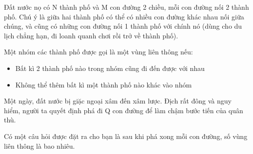 Đất nước nọ có N thành phố và M con đường 2 chiều, mỗi con đường nối 2 thành phố. Chú ý là giữa hai thành phố có thể có nhiều con đường khác nhau nối giữa chúng, và cũng có những con đường nối 1 thành phố với chính nó (dùng cho du lịch chẳng hạn, đi loanh quanh chơi rồi trở về thành phố).  

   Một nhóm các thành phố được gọi là một vùng liên thông nếu:  
\begin{itemize}
	\item     Bất kì 2 thành phố nào trong nhóm cũng đi đến được với nhau   
	\item     Không thể thêm bất kì một thành phố nào khác vào nhóm   
\end{itemize}

   Một ngày, đất nước bị giặc ngoại xâm đến xâm lược. Địch rất đông và nguy hiểm, người ta quyết định phá đi Q con đường để làm chậm bước tiến của quân thù.  

   Có một câu hỏi được đặt ra cho bạn là sau khi phá xong mỗi con đường, số vùng liên thông là bao nhiêu.
